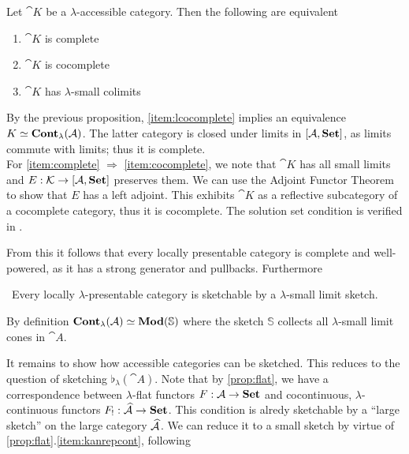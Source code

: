 \begin{Corollary}\label{coro:completecocomplete}
Let $\cat K$ be a $\lambda$-accessible category. Then the following are equivalent
\begin{enumerate}
\item $\cat K$ is complete \label{item:complete}
\item $\cat K$ is cocomplete \label{item:cocomplete}
\item $\cat K$ has $\lambda$-small colimits \label{item:lcocomplete}
\end{enumerate}
\end{Corollary}
\begin{Proof}
By the previous proposition, \ref{item:lcocomplete} implies an equivalence $K \simeq \mathbf{Cont}_\lambda(\mathcal{A})$. The latter category is closed under limits in $[\mathcal{A},\mathbf{Set}]$, as limits commute with limits; thus it is complete. \\

For \ref{item:complete} $\Rightarrow$ \ref{item:cocomplete}, we note that $\cat K$  has all small limits and $E : \mathcal{K} \to [\mathcal{A},\mathbf{Set}]$ preserves them. We can use the Adjoint Functor Theorem to show that $E$ has a left adjoint. This exhibits $\cat K$ as a reflective subcategory of a cocomplete category, thus it is cocomplete. The solution set condition is verified in \cite[\nopp~2.47]{AdamekRosicky}. 
\end{Proof}

From this it follows that every locally presentable category is complete and well-powered, as it has a strong generator and pullbacks. Furthermore

\begin{Corollary}\
Every locally $\lambda$-presentable category is sketchable by a $\lambda$-small limit sketch.
\end{Corollary}
\begin{Proof}
By definition $\mathbf{Cont}_\lambda(\mathcal{A}) \simeq \mathbf{Mod}(\mathbb S)$ where the sketch $\mathbb S$ collects all $\lambda$-small limit cones in $\cat A$.
\end{Proof}

It remains to show how accessible categories can be sketched. This reduces to the question of sketching $\flat_\lambda(\cat A)$. Note that by \ref{prop:flat}, we have a correspondence between $\lambda$-flat functors $F : \mathcal{A} \to \mathbf{Set}$ and cocontinuous, $\lambda$-continuous functors $F_! : \widehat{\mathcal{A}} \to \mathbf{Set}$. This condition is alredy sketchable by a ``large sketch'' on the large category $\widehat{\mathcal{A}}$. We can reduce it to a small sketch by virtue of \ref{prop:flat}.\ref{item:kanrepcont}, following \cite[\nopp~2.58]{AdamekRosicky} \\


